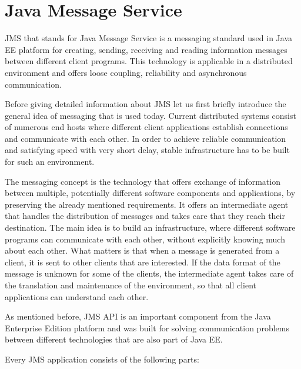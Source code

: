 \documentclass{sigplanconf}
\begin{document}
\section*{Java Message Service}

\smallskip
JMS that stands for Java Message Service is a messaging standard used in Java EE platform for creating, sending, receiving and reading information messages between different client programs. This technology is applicable in a distributed environment and offers loose coupling, reliability and asynchronous communication.

Before giving detailed information about JMS let us first briefly introduce the general idea of messaging that is used today. Current distributed systems consist of numerous end hosts where different client applications establish connections and communicate with each other. In order to achieve reliable communication and satisfying speed with very short delay, stable infrastructure has to be built for such an environment.

The messaging concept is the technology that offers exchange of information between multiple, potentially different software components and applications, by preserving the already mentioned requirements. It offers an intermediate agent that handles the distribution of messages and takes care that they reach their destination. The main idea is to build an infrastructure, where different software programs can communicate with each other, without explicitly knowing much about each other. What matters is that when a message is generated from a client, it is sent to other clients that are interested. If the data format of the message is unknown for some of the clients, the intermediate agent takes care of the translation and maintenance of the environment, so that all client applications can understand each other.

As mentioned before, JMS API is an important component from the Java Enterprise Edition platform and was built for solving communication problems between different technologies that are also part of Java EE.
	
Every JMS application consists of the following parts:
\end{document}

